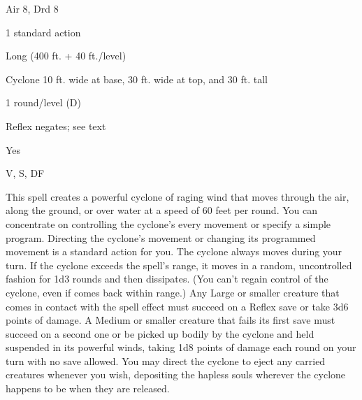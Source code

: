 
\begin{description*}
\item[Level:] Air 8, Drd 8
\item[Casting Time:] 1 standard action
\item[Range:] Long (400 ft. + 40 ft./level)
\item[Effect:] Cyclone 10 ft. wide at base, 30 ft. wide at top, and 30 ft. tall
\item[Duration:] 1 round/level (D)
\item[Saving Throw:] Reflex negates; see text
\item[Spell Resistance:] Yes
\item[Components:] V, S, DF
\end{description*}

This spell creates a powerful cyclone of raging wind that moves through the air,
along the ground, or over water at a speed of 60 feet per round. You can concentrate
on controlling the cyclone's every movement or specify a simple program. Directing
the cyclone's movement or changing its programmed movement is a standard action
for you. The cyclone always moves during your turn. If the cyclone exceeds the
spell's range, it moves in a random, uncontrolled fashion for 1d3 rounds and then
dissipates. (You can't regain control of the cyclone, even if comes back within
range.)
Any Large or smaller creature that comes in contact with the spell effect must
succeed on a Reflex save or take 3d6 points of damage. A Medium or smaller creature
that fails its first save must succeed on a second one or be picked up bodily by
the cyclone and held suspended in its powerful winds, taking 1d8 points of damage
each round on your turn with no save allowed. You may direct the cyclone to eject
any carried creatures whenever you wish, depositing the hapless souls wherever
the cyclone happens to be when they are released.